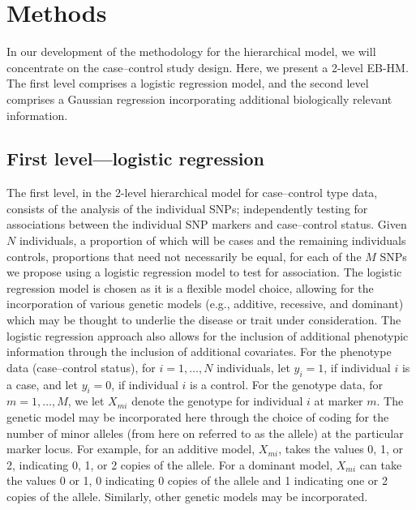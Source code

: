 \section{Methods}
\label{sec2}

In our development of the methodology for the hierarchical model,
we will concentrate on the case--control study design. Here, we
present a 2-level EB-HM. The first level comprises a logistic
regression model, and the second level comprises a Gaussian
regression incorporating additional biologically relevant
information.


\subsection{First level---logistic regression}

The first level, in the 2-level hierarchical model for
case--control type data, consists of the analysis of the
individual SNPs; independently testing for associations between
the individual SNP markers and case--control status. Given $N$
individuals, a proportion of which will be cases and the remaining
individuals controls, proportions that need not necessarily be
equal, for each of the $M$ SNPs we propose using a logistic
regression model to test for association. The logistic regression
model is chosen as it is a flexible model choice, allowing for the
incorporation of various genetic models (e.g., additive,
recessive, and dominant) which may be thought to underlie the
disease or trait under consideration. The logistic regression
approach also allows for the inclusion of additional phenotypic
information through the inclusion of additional covariates. For
the phenotype data (case--control status), for $i = 1, \ldots, N$
individuals, let $y_i = 1$, if individual $i$ is a case,
and let $y_i = 0$, if individual $i$ is a control. For the
genotype data, for $m = 1, \ldots, M$, we let $X_{mi}$
denote the genotype for individual $i$ at marker $m$. The
genetic model may be incorporated here through the
choice of coding for the number of minor alleles (from here on
referred to as the allele) at the particular marker locus. For
example, for an additive model, $X_{mi}$, takes the values 0, 1,
or 2, indicating 0, 1, or 2 copies of the allele. For a
dominant model, $X_{mi}$ can take the values 0 or 1, 0
indicating 0 copies of the allele and 1 indicating one or
2 copies of the allele. Similarly, other genetic models
may be incorporated.

